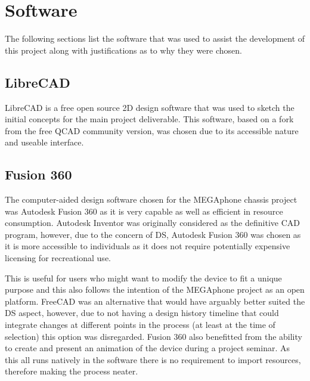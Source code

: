 \section{Software}

The following sections list the software that was used to assist the development of this project along with justifications as to why they were chosen.

\subsection{LibreCAD}

LibreCAD is a free open source 2D design software that was used to sketch the initial concepts for the main project deliverable. 
This software, based on a fork from the free QCAD community version, was chosen due to its accessible nature and useable interface.

\subsection{Fusion 360}

The computer-aided design software chosen for the MEGAphone chassis project was Autodesk Fusion 360 as it is very capable as well as efficient in resource consumption. 
Autodesk Inventor was originally considered as the definitive CAD program, however, due to the concern of DS, Autodesk Fusion 360 was chosen as it is more accessible to individuals as it does not require potentially expensive licensing for recreational use.

This is useful for users who might want to modify the device to fit a unique purpose and this also follows the intention of the MEGAphone project as an open platform.
FreeCAD was an alternative that would have arguably better suited the DS aspect, however, due to not having a design history timeline that could integrate changes at different points in the process (at least at the time of selection) this option was disregarded.
Fusion 360 also benefitted from the ability to create and present an animation of the device during a project seminar.
As this all runs natively in the software there is no requirement to import resources, therefore making the process neater.

